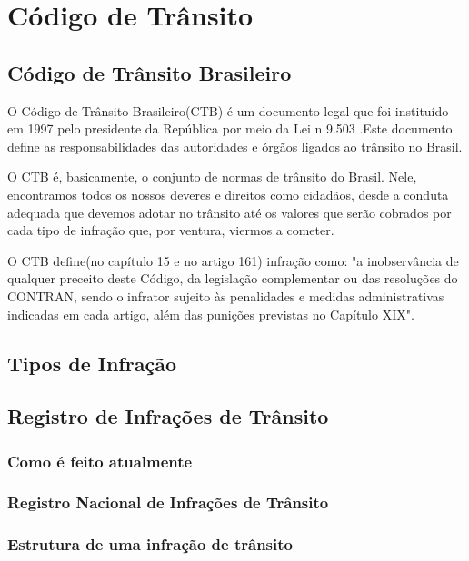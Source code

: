 \section{Código de Trânsito}

\subsection{Código de Trânsito Brasileiro}

O Código de Trânsito Brasileiro(CTB) é um documento legal que foi instituído em 1997 pelo presidente da República por meio da Lei n 9.503 .Este documento define as responsabilidades das autoridades e órgãos ligados ao trânsito no Brasil.

O CTB é, basicamente, o conjunto de normas de trânsito do Brasil. Nele, encontramos todos os nossos deveres e direitos como cidadãos, desde a conduta adequada que devemos adotar no trânsito até os valores que serão cobrados por cada tipo de infração que, por ventura, viermos a cometer.

O CTB define(no capítulo 15 e no artigo 161) infração como: "a inobservância de qualquer preceito deste Código, da legislação complementar ou das resoluções do CONTRAN, sendo o infrator sujeito às penalidades e medidas administrativas indicadas em cada artigo, além das punições previstas no Capítulo XIX". 

\subsection{Tipos de Infração}

\subsection{Registro de Infrações de Trânsito}

    \subsubsection{Como é feito atualmente}

    \subsubsection{Registro Nacional de Infrações de Trânsito}

    \subsubsection{Estrutura de uma infração de trânsito}